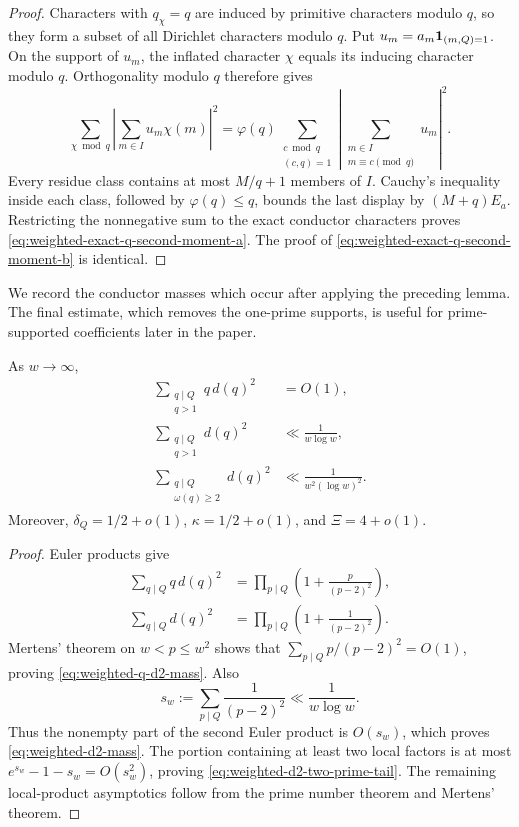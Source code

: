 \begin{proof}
Characters with $q_\chi=q$ are induced by primitive characters modulo $q$,
so they form a subset of all Dirichlet characters modulo $q$.  Put
$u_m=a_m\mathbf 1_{(m,Q)=1}$.  On the support of $u_m$, the inflated character
$\chi$ equals its inducing character modulo $q$.  Orthogonality modulo $q$
therefore gives
\[
 \sum_{\chi\bmod q}
 \left|\sum_{m\in I}u_m\chi(m)\right|^2
 =\varphi(q)
 \sum_{\substack{c\bmod q\\(c,q)=1}}
 \left|\sum_{\substack{m\in I\\m\equiv c\pmod q}}u_m\right|^2.
\]
Every residue class contains at most $M/q+1$ members of $I$.  Cauchy's
inequality inside each class, followed by $\varphi(q)\leq q$, bounds the
last display by $(M+q)E_a$.  Restricting the nonnegative sum to the exact
conductor characters proves
\eqref{eq:weighted-exact-q-second-moment-a}.  The proof of
\eqref{eq:weighted-exact-q-second-moment-b} is identical.
\end{proof}

We record the conductor masses which occur after applying the preceding
lemma.  The final estimate, which removes the one-prime supports, is useful
for prime-supported coefficients later in the paper.

\begin{lemma}
\label{lem:weighted-conductor-masses}
As $w\to\infty$,
\begin{align}
 \sum_{\substack{q\mid Q\\q>1}}q\,d(q)^2&=O(1),
 \label{eq:weighted-q-d2-mass}\\
 \sum_{\substack{q\mid Q\\q>1}}d(q)^2
 &\ll\frac1{w\log w},
 \label{eq:weighted-d2-mass}\\
 \sum_{\substack{q\mid Q\\\omega(q)\geq2}}d(q)^2
 &\ll\frac1{w^2(\log w)^2}.
 \label{eq:weighted-d2-two-prime-tail}
\end{align}
Moreover, $\delta_Q=1/2+o(1)$, $\kappa=1/2+o(1)$, and
$\Xi=4+o(1)$.
\end{lemma}

\begin{proof}
Euler products give
\begin{align*}
 \sum_{q\mid Q}q\,d(q)^2
 &=\prod_{p\mid Q}\left(1+\frac{p}{(p-2)^2}\right),\\
 \sum_{q\mid Q}d(q)^2
 &=\prod_{p\mid Q}\left(1+\frac1{(p-2)^2}\right).
\end{align*}
Mertens' theorem on $w<p\leq w^2$ shows that
$\sum_{p\mid Q}p/(p-2)^2=O(1)$, proving
\eqref{eq:weighted-q-d2-mass}.  Also
\[
 s_w:=\sum_{p\mid Q}\frac1{(p-2)^2}
 \ll\frac1{w\log w}.
\]
Thus the nonempty part of the second Euler product is
$O(s_w)$, which proves \eqref{eq:weighted-d2-mass}.  The portion containing
at least two local factors is at most
$e^{s_w}-1-s_w=O(s_w^2)$, proving
\eqref{eq:weighted-d2-two-prime-tail}.  The remaining local-product
asymptotics follow from the prime number theorem and Mertens' theorem.
\end{proof}

